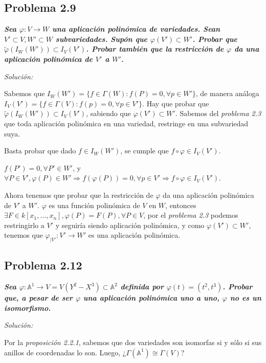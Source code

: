 \subsection{Problema 2.9}

\textit{\textbf{Sea $\varphi: V \rightarrow W$ una aplicación polinómica de variedades. Sean $V'\subset V, W'\subset W$ subvariedades. Supón que $\varphi(V')\subset W'$. Probar que $\tilde{\varphi}(I_W(W'))\subset I_V(V')$. Probar también que la restricción de $\varphi$ da una aplicación polinómica de $V'$ a $W'$.}}


\textit{Solución: }

Sabemos que $I_W(W')=\{f\in \Gamma(W):f(P)=0, \forall p\in W'\}$, de manera análoga $I_V(V')=\{f\in  \Gamma(V): f(p)=0, \forall p\in V'\}$. Hay que probar que $\tilde{\varphi}(I_W(W'))\subset I_V(V')$, sabiendo que $\varphi(V')\subset W'$. Sabemos del \textit{problema 2.3} que toda aplicación polinómica en una variedad, restringe en una subvariedad suya.

Basta probar que dado $f\in I_W(W')$, se cumple que $f\circ \varphi \in I_V(V')$.

$f(P')=0, \forall P'\in W'$, y $\forall P  \in V', \varphi(P)\in W'\Rightarrow f(\varphi(P))=0, \forall p \in V' \Rightarrow f \circ \varphi \in I_V(V')$.

Ahora tenemos que probar que la restricción de $\varphi $ da una aplicación polinómica de $V'$ a $W'$. $\varphi$ es una función polinómica de $V$ en $W$, entonces $\exists F\in k[x_1,\dots,x_n], \varphi(P)=F(P), \forall P\in V$, por el \textit{problema 2.3} podemos restringirlo a $V'$ y seguiría siendo aplicación polinómica, y como $\varphi(V')\subset W'$, tenemos que $\varphi_{|V'}:V'\rightarrow W'$ es una aplicación polinómica. 




\subsection{Problema 2.12}

\textit{\textbf{Sea $\varphi: \mathbb{A}^1\rightarrow V=V(Y^2-X^3)\subset \mathbb{A}^2$ definida por $\varphi(t)=(t^2,t^3)$. Probar que, a pesar de ser $\varphi$ una aplicación polinómica uno a uno, $\varphi$ no es un isomorfismo.}}

\textit{Solución: }

Por la \textit{proposición 2.2.1}, sabemos que dos variedades son isomorfas si y sólo si sus anillos de coordenadas lo son. Luego, ¿$\Gamma(\mathbb{A}^1)\cong \Gamma(V)$?

